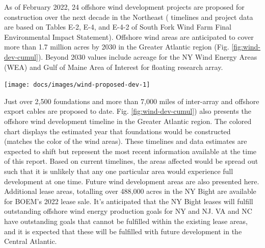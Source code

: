 \documentclass[
  10pt,
]{article}
\let\origfigure\figure
\let\endorigfigure\endfigure
\renewenvironment{figure}[1][2] {
    \expandafter\origfigure\expandafter[H]
} {
    \endorigfigure
}
\begin{document}
As of February 2022, 24 offshore wind development projects are proposed
for construction over the next decade in the Northeast ( timelines and
project data are based on Tables E-2, E-4, and E-4-2 of South Fork Wind
Farm Final Environmental Impact Statement). Offshore wind areas are
anticipated to cover more than 1.7 million acres by 2030 in the Greater
Atlantic region (Fig. \ref{fig:wind-dev-cumul}). Beyond 2030 values
include acreage for the NY Wind Energy Areas (WEA) and Gulf of Maine
Area of Interest for floating research array.

\begin{figure}

{\centering \texttt{[image: docs/images/wind-proposed-dev-1]} 

}

\caption{Proposed wind development on the northeast shelf.}\label{fig:wind-proposed-dev}
\end{figure}

Just over 2,500 foundations and more than 7,000 miles of inter-array and
offshore export cables are proposed to date. Fig.
\ref{fig:wind-dev-cumul}) also presents the offshore wind development
timeline in the Greater Atlantic region. The colored chart displays the
estimated year that foundations would be constructed (matches the color
of the wind areas). These timelines and data estimates are expected to
shift but represent the most recent information available at the time of
this report. Based on current timelines, the areas affected would be
spread out such that it is unlikely that any one particular area would
experience full development at one time. Future wind development areas
are also presented here. Additional lease areas, totalling over 488,000
acres in the NY Bight are available for BOEM's 2022 lease sale. It's
anticipated that the NY Bight leases will fulfill outstanding offshore
wind energy production goals for NY and NJ. VA and NC have outstanding
goals that cannot be fulfilled within the existing lease areas, and it
is expected that these will be fulfilled with future development in the
Central Atlantic.
\end{document}
